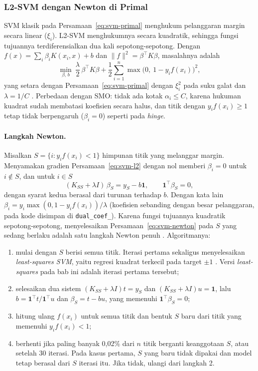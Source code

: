\subsubsection{L2-SVM dengan Newton di Primal}
\label{subsubsec:svm-l2svm}
SVM klasik pada Persamaan~\eqref{eq:svm-primal} menghukum pelanggaran margin secara linear ($\xi_i$). L2-SVM menghukumnya secara kuadratik, sehingga fungsi tujuannya terdiferensialkan dua kali sepotong-sepotong. Dengan $f(x) = \sum_i \beta_i K(x_i, x) + b$ dan $\lVert f\rVert^2 = \beta^{\top}K\beta$, masalahnya adalah
\begin{equation}
	\min_{\beta,\,b}\ \frac{\lambda}{2}\,\beta^{\top}K\beta + \frac{1}{2}\sum_{i=1}^{n} \max\big(0,\ 1 - y_i f(x_i)\big)^{2},
	\label{eq:svm-l2}
\end{equation}
yang setara dengan Persamaan~\eqref{eq:svm-primal} dengan $\xi_i^2$ pada suku galat dan $\lambda = 1/C$ \cite{chapelle2007primal}. Perbedaan dengan SMO: tidak ada kotak $\alpha_i \le C$, karena hukuman kuadrat sudah membatasi koefisien secara halus, dan titik dengan $y_i f(x_i) \ge 1$ tetap tidak berpengaruh ($\beta_i = 0$) seperti pada \textit{hinge}.

\paragraph{Langkah Newton.} Misalkan $S = \{i : y_i f(x_i) < 1\}$ himpunan titik yang melanggar margin. Menyamakan gradien Persamaan~\eqref{eq:svm-l2} dengan nol memberi $\beta_i = 0$ untuk $i \notin S$, dan untuk $i \in S$
\begin{equation}
	(K_{SS} + \lambda I)\,\beta_S = y_S - b\mathbf{1}, \qquad \mathbf{1}^{\top}\beta_S = 0,
	\label{eq:svm-newton}
\end{equation}
dengan syarat kedua berasal dari turunan terhadap $b$. Dengan kata lain $\beta_i = y_i\max(0, 1 - y_i f(x_i))/\lambda$ (koefisien sebanding dengan besar pelanggaran, pada kode disimpan di \texttt{dual\_coef\_}). Karena fungsi tujuannya kuadratik sepotong-sepotong, menyelesaikan Persamaan~\eqref{eq:svm-newton} pada $S$ yang sedang berlaku adalah satu langkah Newton penuh \cite{chapelle2007primal}. Algoritmanya:
\begin{enumerate}
	\item mulai dengan $S$ berisi semua titik. Iterasi pertama sekaligus menyelesaikan \textit{least-squares SVM}, yaitu regresi kuadrat terkecil pada target $\pm 1$ \cite{suykens1999lssvm}. Versi \textit{least-squares} pada bab ini adalah iterasi pertama tersebut;
	\item selesaikan dua sistem $(K_{SS}+\lambda I)t = y_S$ dan $(K_{SS}+\lambda I)u = \mathbf{1}$, lalu $b = \mathbf{1}^{\top}t / \mathbf{1}^{\top}u$ dan $\beta_S = t - bu$, yang memenuhi $\mathbf{1}^{\top}\beta_S = 0$;
	\item hitung ulang $f(x_i)$ untuk semua titik dan bentuk $S$ baru dari titik yang memenuhi $y_i f(x_i) < 1$;
	\item berhenti jika paling banyak 0,02\% dari $n$ titik berganti keanggotaan $S$, atau setelah 30 iterasi. Pada kasus pertama, $S$ yang baru tidak dipakai dan model tetap berasal dari $S$ iterasi itu. Jika tidak, ulangi dari langkah 2.
\end{enumerate}

